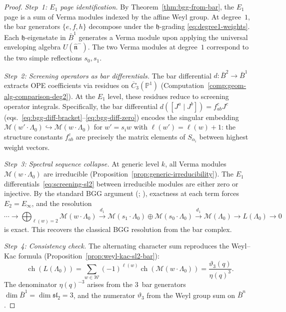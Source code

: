 \begin{proof}
\emph{Step~1: $E_1$ page identification.}
By Theorem~\ref{thm:bgg-from-bar}, the $E_1$ page is a sum of Verma
modules indexed by the affine Weyl group.  At degree~$1$, the bar
generators $\{e, f, h\}$ decompose under the $\mathfrak{h}$-grading
\eqref{eq:degree1-weights}.  Each $\mathfrak{h}$-eigenstate in
$\bar{B}^1$ generates a Verma module upon applying the universal
enveloping algebra $U(\hat{\mathfrak{n}}^-)$.  The two Verma modules
at degree~$1$ correspond to the two simple reflections $s_0, s_1$.

\emph{Step~2: Screening operators as bar differentials.}
The bar differential $d: \bar{B}^2 \to \bar{B}^1$ extracts OPE
coefficients via residues on $\overline{C}_3(\mathbb{P}^1)$
(Computation~\ref{comp:geom-alg-comparison-deg2}).  At the
$E_1$ level, these residues reduce to screening operator integrals.
Specifically, the bar differential
$d([J^a \mid J^b]) = f_{ab}^c J^c$
(eqs.~\eqref{eq:bgg-diff-bracket}--\eqref{eq:bgg-diff-zero}) encodes
the singular embedding $\mathcal{M}(w' \cdot \Lambda_0) \hookrightarrow
\mathcal{M}(w \cdot \Lambda_0)$ for $w' = s_i w$ with $\ell(w') =
\ell(w) + 1$: the structure constants $f_{ab}^c$ are precisely the
matrix elements of $S_{\alpha_i}$ between highest weight vectors.

\emph{Step~3: Spectral sequence collapse.}
At generic level $k$, all Verma modules $\mathcal{M}(w \cdot \Lambda_0)$
are irreducible
(Proposition~\ref{prop:generic-irreducibility}).  The $E_1$
differentials~\eqref{eq:screening-sl2} between irreducible modules are
either zero or injective.  By the standard BGG argument
(\cite{BGG76}; \cite[§10.7]{Kac}),
exactness at each term forces $E_2 = E_\infty$,
and the resolution
\[
\cdots \to \bigoplus_{\ell(w)=2} \mathcal{M}(w \cdot \Lambda_0)
\xrightarrow{d_1}
\mathcal{M}(s_1 \cdot \Lambda_0) \oplus
\mathcal{M}(s_0 \cdot \Lambda_0)
\xrightarrow{d_1}
\mathcal{M}(\Lambda_0)
\to L(\Lambda_0) \to 0
\]
is exact.  This recovers the classical BGG resolution from the bar
complex.

\emph{Step~4: Consistency check.}
The alternating character sum reproduces the Weyl--Kac formula
(Proposition~\ref{prop:weyl-kac-sl2-bar}):
\[
\operatorname{ch}(L(\Lambda_0))
= \sum_{w \in \mathcal{W}} (-1)^{\ell(w)}
  \operatorname{ch}(\mathcal{M}(w \cdot \Lambda_0))
= \frac{\vartheta_3(q)}{\eta(q)^3}.
\]
The denominator $\eta(q)^{-3}$ arises from the 3~bar generators
$\dim \bar{B}^1 = \dim \mathfrak{sl}_2 = 3$, and the numerator
$\vartheta_3$ from the Weyl group sum on $\bar{B}^n$.
\end{proof}

